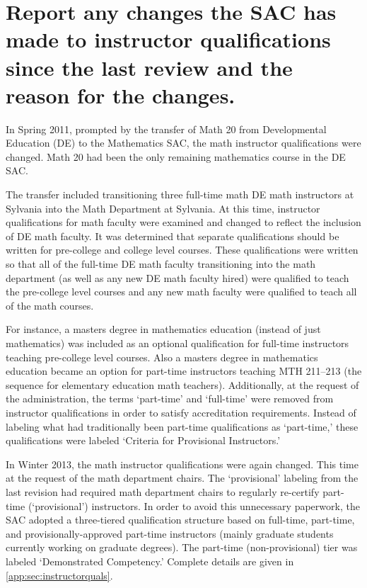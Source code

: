 \section{Report any changes the SAC has made to instructor qualifications since
the last review and the reason for the changes.}
In Spring 2011, prompted by the transfer of Math 20 from Developmental
Education (DE) to the Mathematics SAC, the math instructor qualifications were
changed.  Math 20 had been the only remaining mathematics course in the DE SAC.  

The transfer included transitioning three full-time math DE math instructors at
Sylvania into the Math Department at Sylvania.  At this time, instructor
qualifications for math faculty were examined and changed to reflect the
inclusion of DE math faculty.  It was determined that separate qualifications
should be written for pre-college and college level courses.  These
qualifications were written so that all of the full-time DE math faculty
transitioning into the math department (as well as any new DE math faculty
hired) were qualified to teach the pre-college level courses and any new math
faculty were qualified to teach all of the math courses.  

For instance, a masters degree in mathematics education (instead of just
mathematics) was included as an optional qualification for full-time
instructors teaching pre-college level courses.  Also a masters degree in
mathematics education became an option for part-time instructors teaching MTH
211--213 (the sequence for elementary education math teachers).  Additionally,
at the request of the administration, the terms `part-time' and `full-time'
were removed from instructor qualifications in order to satisfy accreditation
requirements.  Instead of labeling what had traditionally been part-time
qualifications as `part-time,' these qualifications were labeled `Criteria for
Provisional Instructors.'

In Winter 2013, the math instructor qualifications were again changed.  This
time at the request of the math department chairs.  The `provisional' labeling
from the last revision had required math department chairs to regularly
re-certify part-time (`provisional') instructors.  In order to avoid this
unnecessary paperwork, the SAC adopted a three-tiered qualification structure
based on full-time, part-time, and provisionally-approved part-time instructors
(mainly graduate students currently working on graduate degrees).  The
part-time (non-provisional) tier was labeled `Demonstrated Competency.'
Complete details are given in \vref{app:sec:instructorquals}.
